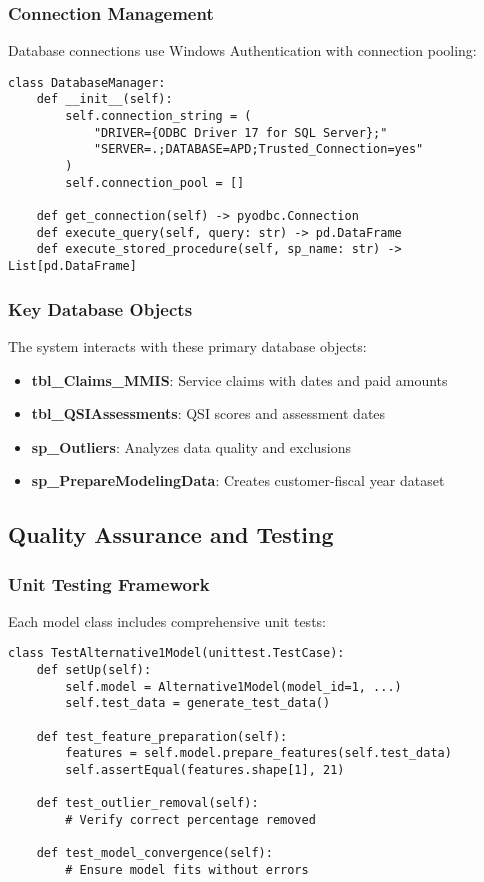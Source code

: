 \subsubsection{Connection Management}

Database connections use Windows Authentication with connection pooling:

\begin{verbatim}
class DatabaseManager:
    def __init__(self):
        self.connection_string = (
            "DRIVER={ODBC Driver 17 for SQL Server};"
            "SERVER=.;DATABASE=APD;Trusted_Connection=yes"
        )
        self.connection_pool = []
    
    def get_connection(self) -> pyodbc.Connection
    def execute_query(self, query: str) -> pd.DataFrame
    def execute_stored_procedure(self, sp_name: str) -> List[pd.DataFrame]
\end{verbatim}

\subsubsection{Key Database Objects}

The system interacts with these primary database objects:

\begin{itemize}
    \item \textbf{tbl\_Claims\_MMIS}: Service claims with dates and paid amounts
    \item \textbf{tbl\_QSIAssessments}: QSI scores and assessment dates
    \item \textbf{sp\_Outliers}: Analyzes data quality and exclusions
    \item \textbf{sp\_PrepareModelingData}: Creates customer-fiscal year dataset
\end{itemize}

\subsection{Quality Assurance and Testing}

\subsubsection{Unit Testing Framework}

Each model class includes comprehensive unit tests:

\begin{verbatim}
class TestAlternative1Model(unittest.TestCase):
    def setUp(self):
        self.model = Alternative1Model(model_id=1, ...)
        self.test_data = generate_test_data()
    
    def test_feature_preparation(self):
        features = self.model.prepare_features(self.test_data)
        self.assertEqual(features.shape[1], 21)
    
    def test_outlier_removal(self):
        # Verify correct percentage removed
    
    def test_model_convergence(self):
        # Ensure model fits without errors
\end{verbatim}


